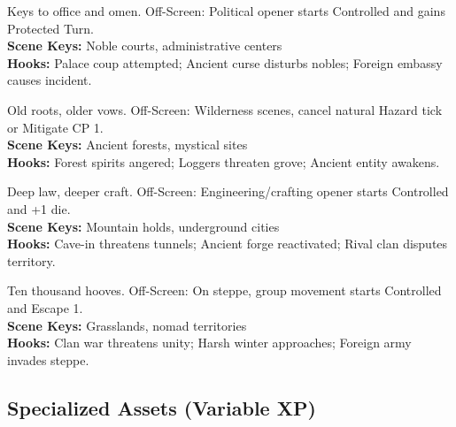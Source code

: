 \documentclass[12pt]{article}
\begin{document}
\begin{description}[leftmargin=*]
  \item[\textbf{Ashaani Palace Complex}] Keys to office and omen. Off-Screen: Political opener starts Controlled and gains Protected Turn. \\
  \textbf{Scene Keys:} Noble courts, administrative centers \\
  \textbf{Hooks:} Palace coup attempted; Ancient curse disturbs nobles; Foreign embassy causes incident.

  \item[\textbf{Valewood Grove Sanctuary}] Old roots, older vows. Off-Screen: Wilderness scenes, cancel natural Hazard tick or Mitigate CP 1. \\
  \textbf{Scene Keys:} Ancient forests, mystical sites \\
  \textbf{Hooks:} Forest spirits angered; Loggers threaten grove; Ancient entity awakens.

  \item[\textbf{Dwarven Mountain Hall}] Deep law, deeper craft. Off-Screen: Engineering/crafting opener starts Controlled and +1 die. \\
  \textbf{Scene Keys:} Mountain holds, underground cities \\
  \textbf{Hooks:} Cave-in threatens tunnels; Ancient forge reactivated; Rival clan disputes territory.

  \item[\textbf{Ykrul Steppe Confederation}] Ten thousand hooves. Off-Screen: On steppe, group movement starts Controlled and Escape 1. \\
  \textbf{Scene Keys:} Grasslands, nomad territories \\
  \textbf{Hooks:} Clan war threatens unity; Harsh winter approaches; Foreign army invades steppe.
\end{description}

\subsection*{Specialized Assets (Variable XP)}
\end{document}
